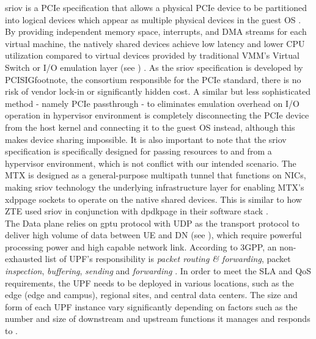 \ac{sriov} is a \ac{PCIe} specification that allows a physical \ac{PCIe} device to be partitioned into logical devices which appear as multiple physical devices in the guest \ac{OS} \cite{ibm_sriov}\cite{vmware_sriov}. 
By providing independent memory space, interrupts, and \ac{DMA} streams for each virtual machine, the natively shared devices achieve low latency and lower CPU utilization compared to virtual devices provided by traditional \ac{VMM}'s Virtual Switch or  I/O emulation layer (see ) \cite{intel_sriov}.
As the \ac{sriov} specification is developed by \ac{PCISIGfootnote}, the consortium responsible for the \ac{PCIe} standard, there is no risk of vendor lock-in or significantly hidden cost.
A similar but less sophisticated method - namely \ac{PCIe} passthrough - to eliminates emulation overhead on I/O operation in hypervisor environment is completely disconnecting the \ac{PCIe} device from the host kernel and connecting it to the guest \ac{OS} instead, although this makes device sharing impossible.
It is also important to note that the \ac{sriov} specification is specifically designed for passing resources to and from a hypervisor environment, which is not conflict with our intended scenario.
The \ac{MTX} is designed as a general-purpose multipath tunnel that functions on \ac{NIC}s, making \ac{sriov} technology the underlying infrastructure layer for enabling \ac{MTX}'s \ac{xdppage} sockets to operate on the native shared devices.
This is similar to how \ac{ZTE} used \ac{sriov} in conjunction with \ac{dpdkpage} in their software stack \cite{zte_upf_full_whitepaper}.
\\

The Data plane relies on \ac{gptu} protocol with \ac{UDP} as the transport protocol to deliver high volume of data between \ac{UE} and \ac{DN} (see ), which require powerful processing power and high capable network link.
According to \ac{3GPP}, an non-exhausted list of \ac{UPF}'s responsibility is \textit{packet routing \& forwarding}, packet \textit{inspection}, \textit{buffering}, \textit{sending} and \textit{forwarding} \cite{3gpp_5g_system_architect_spec_release_18}.
In order to meet the \ac{SLA} and \ac{QoS} requirements, the \ac{UPF} needs to be deployed in various locations, such as the edge (edge and campus), regional sites, and central data centers. 
The size and form of each \ac{UPF} instance vary significantly depending on factors such as the number and size of downstream and upstream functions it manages and responds to \cite{zte_upf_full_whitepaper}.

